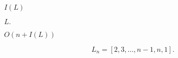 \documentclass[10pt]{book}
\begin{document}
\begin{mdSnippets}
\begin{mdDisplaySnippet}[20657d5291fd79b369fa7d45cfa0876f]
\[\]%
\end{mdDisplaySnippet}%
\begin{mdInlineSnippet}[8d12fd654fa95776cfd1b159be8f2986]%
$I(L)$\end{mdInlineSnippet}%
\begin{mdInlineSnippet}[ca0b0549db85f718a48e0505ac9273a2]%
$L.$\end{mdInlineSnippet}%
\begin{mdInlineSnippet}[0d546c92ac6f7a69280290d3ad020546]%
$O(n + I(L))$\end{mdInlineSnippet}%
\begin{mdDisplaySnippet}[34c020a4f3635869b8e7002604c28e1f]%
\[%
L_n = [2, 3, \dots, n-1, n, 1].
\]%
\end{mdDisplaySnippet}%

\end{mdSnippets}
\end{document}
